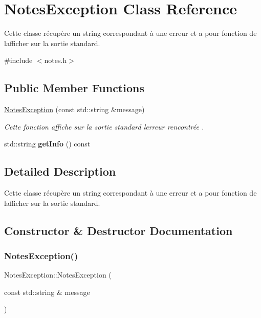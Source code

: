 \hypertarget{class_notes_exception}{}\section{Notes\+Exception Class Reference}
\label{class_notes_exception}


Cette classe récupère un string correspondant à une erreur et a pour fonction de l\textquotesingle{}afficher sur la sortie standard.  




{\ttfamily \#include $<$notes.\+h$>$}

\subsection*{Public Member Functions}
\begin{DoxyCompactItemize}
\item 
\hyperlink{class_notes_exception_a557a49cbc09d8bcbd088ed09edebd086}{Notes\+Exception} (const std\+::string \&message)
\begin{DoxyCompactList}\small\item\em Cette fonction affiche sur la sortie standard l\textquotesingle{}erreur rencontrée . \end{DoxyCompactList}\item 
\mbox{\label{class_notes_exception_a5108cf9d122f28f9cb51c0c31c4f2a35}} 
std\+::string {\bfseries get\+Info} () const
\end{DoxyCompactItemize}


\subsection{Detailed Description}
Cette classe récupère un string correspondant à une erreur et a pour fonction de l\textquotesingle{}afficher sur la sortie standard. 

\subsection{Constructor \& Destructor Documentation}
\mbox{\label{class_notes_exception_a557a49cbc09d8bcbd088ed09edebd086}} 
\subsubsection{\texorpdfstring{Notes\+Exception()}{NotesException()}}
{\footnotesize\ttfamily Notes\+Exception\+::\+Notes\+Exception (\begin{DoxyParamCaption}\item[{const std\+::string \&}]{message }\end{DoxyParamCaption})\hspace{0.3cm}{\ttfamily [inline]}}



